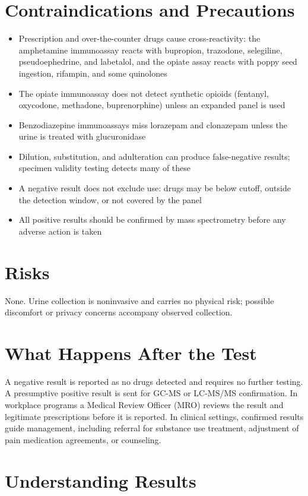\section*{Contraindications and Precautions}
\begin{itemize}
  \item Prescription and over-the-counter drugs cause cross-reactivity: the amphetamine immunoassay reacts with bupropion, trazodone, selegiline, pseudoephedrine, and labetalol, and the opiate assay reacts with poppy seed ingestion, rifampin, and some quinolones
  \item The opiate immunoassay does not detect synthetic opioids (fentanyl, oxycodone, methadone, buprenorphine) unless an expanded panel is used
  \item Benzodiazepine immunoassays miss lorazepam and clonazepam unless the urine is treated with glucuronidase
  \item Dilution, substitution, and adulteration can produce false-negative results; specimen validity testing detects many of these
  \item A negative result does not exclude use: drugs may be below cutoff, outside the detection window, or not covered by the panel
  \item All positive results should be confirmed by mass spectrometry before any adverse action is taken \cite{standridge2010urine}
\end{itemize}
\section*{Risks}
None. Urine collection is noninvasive and carries no physical risk; possible discomfort or privacy concerns accompany observed collection.
\section*{What Happens After the Test}
A negative result is reported as no drugs detected and requires no further testing. A presumptive positive result is sent for GC-MS or LC-MS/MS confirmation. In workplace programs a Medical Review Officer (MRO) reviews the result and legitimate prescriptions before it is reported. In clinical settings, confirmed results guide management, including referral for substance use treatment, adjustment of pain medication agreements, or counseling.
\section*{Understanding Results}
